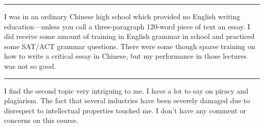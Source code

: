\documentclass{writing}
\begin{document}
\bigskip
\hrule
\bigskip

I was in an ordinary Chinese high school which provided no English writing education—unless you call a three-paragraph 120-word piece of text an essay. I did receive some amount of training in English grammar in school and practiced some SAT/ACT grammar questions. There were some though sparse training on how to write a critical essay in Chinese, but my performance in those lectures was not so good.

\bigskip
\hrule
\bigskip

I find the second topic very intriguing to me. I have a lot to say on piracy and plagiarism. The fact that several industries have been severely damaged due to disrespect to intellectual properties touched me. I don’t have any comment or concerns on this course.
\end{document}
